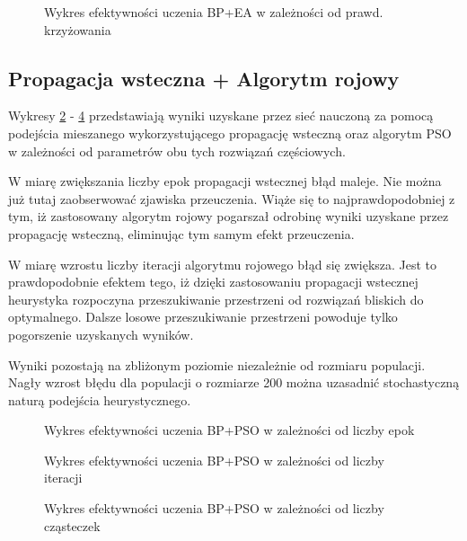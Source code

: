 \documentclass[11pt,a4paper,oneside]{report}
\begin{document}
\begin{figure}[H]
	\caption{Wykres efektywności uczenia BP+EA w zależności od prawd. krzyżowania \label{figure:bp_ea_cp}}
	
\end{figure}

\subsection{Propagacja wsteczna + Algorytm rojowy}

Wykresy \ref{figure:bp_pso_epochs} - \ref{figure:bp_pso_population} przedstawiają wyniki uzyskane przez sieć nauczoną za pomocą podejścia mieszanego wykorzystującego propagację wsteczną oraz algorytm PSO w zależności od parametrów obu tych rozwiązań częściowych. 

W miarę zwiększania liczby epok propagacji wstecznej błąd maleje. Nie można już tutaj zaobserwować zjawiska przeuczenia. Wiąże się to najprawdopodobniej z tym, iż zastosowany algorytm rojowy pogarszał odrobinę wyniki uzyskane przez propagację wsteczną, eliminując tym samym efekt przeuczenia.

W miarę wzrostu liczby iteracji algorytmu rojowego błąd się zwiększa. Jest to prawdopodobnie efektem tego, iż dzięki zastosowaniu propagacji wstecznej heurystyka rozpoczyna przeszukiwanie przestrzeni od rozwiązań bliskich do optymalnego. Dalsze losowe przeszukiwanie przestrzeni powoduje tylko pogorszenie uzyskanych wyników. 

Wyniki pozostają na zbliżonym poziomie niezależnie od rozmiaru populacji. Nagły wzrost błędu dla populacji o rozmiarze 200 można uzasadnić stochastyczną naturą podejścia heurystycznego.

\begin{figure}[H]
	\caption{Wykres efektywności uczenia BP+PSO w zależności od liczby epok \label{figure:bp_pso_epochs}}
	
\end{figure}

\begin{figure}[H]
	\caption{Wykres efektywności uczenia BP+PSO w zależności od liczby iteracji \label{figure:bp_pso_generations}}
	
\end{figure}

\begin{figure}[H]
	\caption{Wykres efektywności uczenia BP+PSO w zależności od liczby cząsteczek \label{figure:bp_pso_population}}
	
\end{figure}
\end{document}
